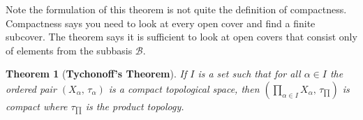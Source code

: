\documentclass{article}
\theoremstyle{plain}
\newtheorem{theorem}{Theorem}[section]
\theoremstyle{normal}
\begin{document}
        Note the formulation of this theorem is not quite the definition of
        compactness. Compactness says you need to look at every open cover and
        find a finite subcover. The theorem says it is sufficient to look at
        open covers that consist only of elements from the subbasis
        $\mathcal{B}$.
        \begin{theorem}[\textbf{Tychonoff's Theorem}]
            If $I$ is a set such that for all $\alpha\in{I}$ the ordered pair
            $(X_{\alpha},\,\tau_{\alpha})$ is a compact topological space,
            then $(\prod_{\alpha\in{I}}X_{\alpha},\,\tau_{\prod})$ is
            compact where $\tau_{\prod}$ is the product topology.
        \end{theorem}
\end{document}
